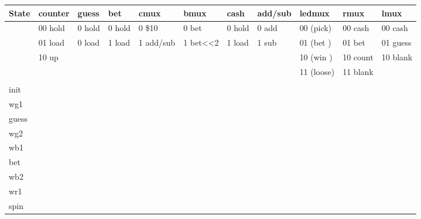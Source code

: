 \begin{description}
\begin{landscape}
\begin{table}
{\begin{tabular}{l|l|l|l|l|l|l|l|l|l|l}
                        State &  counter& guess  & bet    & cmux      & bmux     & cash   & add/sub & ledmux
                        & rmux   & lmux \\ \hline
                        & 00 hold & 0 hold & 0 hold & 0 \$10    & 0 bet    & 0 hold & 0 add  & 00 (pick) &00
                        cash &00 cash  \\ \hline
                        & 01 load & 0 load & 1 load & 1 add/sub & 1 bet<<2 & 1 load & 1 sub  & 01 (bet ) &01
                        bet  &01 guess \\ \hline
                        & 10 up   &        &        &            &          &        &        & 10 (win ) &10
                        count&10 blank \\ \hline
                        &         &        &        &            &          &        &        & 11 (loose)&11
                        blank&         \\ \hline
                        &         &        &        &            &          &        &        &          &
                        &   \\ \hline
                        init  &       &       &       &           &         &       &       &        &       & \\ \hline
                        wg1   &       &       &       &           &         &       &       &        &       & \\ \hline
                        guess &       &       &       &           &         &       &       &        &       & \\ \hline
                        wg2   &       &       &       &           &         &       &       &        &       & \\ \hline
                        wb1   &       &       &       &           &         &       &       &        &       & \\ \hline
                        bet   &       &       &       &           &         &       &       &        &       & \\ \hline
                        wb2   &       &       &       &           &         &       &       &        &       & \\ \hline
                        wr1   &       &       &       &           &         &       &       &        &       & \\ \hline
                        spin  &       &       &       &           &         &       &       &        &       & \\ \hline

\end{tabular}}
\end{table}
\end{landscape}
\end{description}
